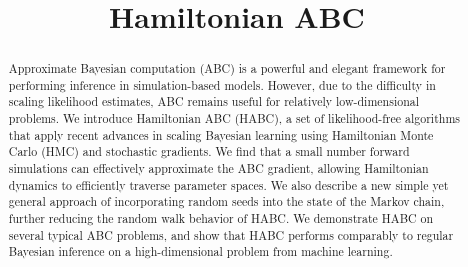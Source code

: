 \documentclass[]{article}
\date{}
\title{Hamiltonian ABC}
\author{} %
\begin{document}
 
	\vskip -0.3in
  
\maketitle

% 
% 
% 
\begin{abstract} 
  Approximate Bayesian computation (ABC) is a powerful and elegant framework for performing inference in simulation-based models.  However, due to the difficulty in scaling likelihood estimates, ABC remains useful for relatively low-dimensional problems. We introduce Hamiltonian ABC (HABC), a set of likelihood-free algorithms that apply recent advances in scaling Bayesian learning using Hamiltonian Monte Carlo (HMC) and stochastic gradients.     We find that a small number forward simulations can effectively approximate the ABC gradient, allowing Hamiltonian dynamics to efficiently traverse parameter spaces.  We also describe a new simple yet general approach of incorporating random seeds into the state of the Markov chain, further reducing the random walk behavior of HABC.  We demonstrate HABC on several typical ABC problems, and show that HABC performs comparably to regular Bayesian inference on a high-dimensional problem from machine learning.

\end{abstract}
\end{document}
